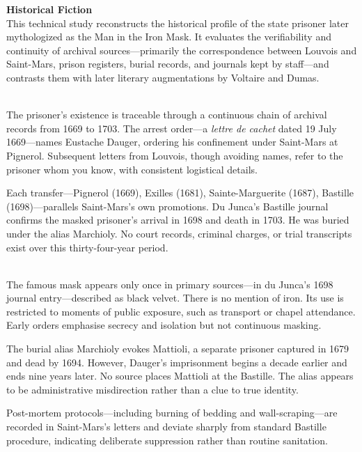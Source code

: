 \begin{technical}
{\Large\textbf{Historical Fiction}}\\[0.1em]

This technical study reconstructs the historical profile of the state prisoner later mythologized as \QSOpen{}the Man in the Iron Mask.\QSClose{} It evaluates the verifiability and continuity of archival sources—primarily the correspondence between Louvois and Saint-Mars, prison registers, burial records, and journals kept by staff—and contrasts them with later literary augmentations by Voltaire and Dumas. 

\\[0.3em]
The prisoner’s existence is traceable through a continuous chain of archival records from 1669 to 1703. The arrest order—a \textit{lettre de cachet} dated 19 July 1669—names \QSOpen{}Eustache Dauger,\QSClose{} ordering his confinement under Saint-Mars at Pignerol. Subsequent letters from Louvois, though avoiding names, refer to \QSOpen{}the prisoner whom you know,\QSClose{} with consistent logistical details.

Each transfer—Pignerol (1669), Exilles (1681), Sainte-Marguerite (1687), Bastille (1698)—parallels Saint-Mars’s own promotions. Du Junca’s Bastille journal confirms the masked prisoner’s arrival in 1698 and death in 1703. He was buried under the alias \QSOpen{}Marchioly.\QSClose{} No court records, criminal charges, or trial transcripts exist over this thirty-four-year period.

\\[0.3em]
The famous mask appears only once in primary sources—in du Junca’s 1698 journal entry—described as \QSOpen{}black velvet.\QSClose{} There is no mention of iron. Its use is restricted to moments of public exposure, such as transport or chapel attendance. Early orders emphasise secrecy and isolation but not continuous masking.

The burial alias \QSOpen{}Marchioly\QSClose{} evokes \QSOpen{}Mattioli,\QSClose{} a separate prisoner captured in 1679 and dead by 1694. However, Dauger’s imprisonment begins a decade earlier and ends nine years later. No source places Mattioli at the Bastille. The alias appears to be administrative misdirection rather than a clue to true identity.

Post-mortem protocols—including burning of bedding and wall-scraping—are recorded in Saint-Mars’s letters and deviate sharply from standard Bastille procedure, indicating deliberate suppression rather than routine sanitation.


\end{technical}
